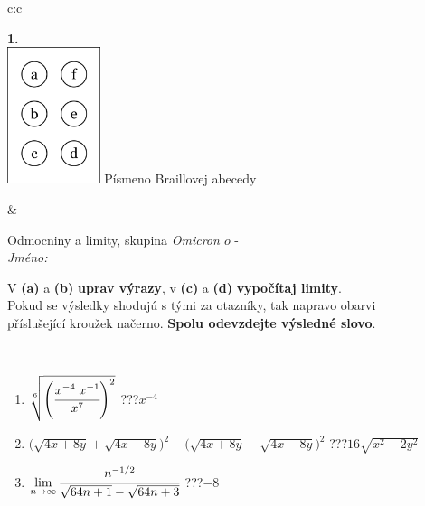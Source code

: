 \documentclass[10pt]{report}
\newcommand\omicron{o}
\begin{document}
\begin{tabular}{c:c}
\begin{minipage}[c][104.5mm][t]{0.5\linewidth}
\begin{center}
\begin{minipage}{0.20\linewidth}
\begin{center}
{\Huge\bfseries 1.} \\[2mm]
\includegraphics[height=40mm]{../images/braille.png}
{\small Písmeno Braillovej abecedy}
\end{center}
\end{minipage}
\end{center}
\end{minipage}
&
\begin{minipage}[c][104.5mm][t]{0.5\linewidth}
\begin{center}
\vspace{7mm}
{\huge Odmocniny a limity, skupina \textit{Omicron $\omicron$} -}\\[5mm]
\textit{Jméno:}\phantom{xxxxxxxxxxxxxxxxxxxxxxxxxxxxxxxxxxxxxxxxxxxxxxxxxxxxxxxxxxxxxxxxx}\\[5mm]
\begin{minipage}{0.95\linewidth}
\begin{center}
V \textbf{(a)} a \textbf{(b)} \textbf{uprav výrazy}, v \textbf{(c)} a \textbf{(d)} \textbf{vypočítaj limity}.\\Pokud se výsledky shodujú s tými za otazníky, tak napravo obarvi\\příslušející kroužek načerno. \textbf{Spolu odevzdejte výsledné slovo}.
\end{center}
\end{minipage}
\\[1mm]
\begin{minipage}{0.79\linewidth}
\begin{center}
\begin{varwidth}{\linewidth}
\begin{enumerate}
\small
\item $\sqrt[6]{\left(\cfrac{x^{-4}\;x^{-1}}{x^{7}}\right)^{2}}$\quad \dotfill\; ???\;\dotfill \quad $x^{-4}$
\item {\footnotesize{\scriptsize$\big(\sqrt{4x+8y}+\sqrt{4x-8y}\big)^2-\big(\sqrt{4x+8y}-\sqrt{4x-8y}\big)^2$}\quad \dotfill\; ???\;\dotfill \quad $16\sqrt{x^2-2y^2}$}
\item $\lim\limits_{n\to\infty}\cfrac{n^{-1/2}}{\sqrt{64n+1}-\sqrt{64n+3}}$\quad \dotfill\; ???\;\dotfill \quad $-8$

\end{enumerate}
\end{varwidth}
\end{center}
\end{minipage}
\end{center}
\end{minipage}
\end{tabular}
\end{document}

